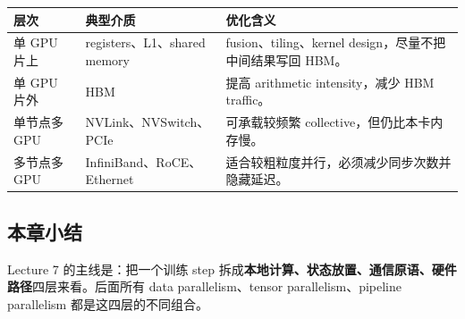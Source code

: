 \begin{center}
\begin{tabular}{L{0.25\textwidth}L{0.3\textwidth}L{0.35\textwidth}}
\toprule
层次 & 典型介质 & 优化含义 \\
\midrule
单 GPU 片上 & registers、L1、shared memory & fusion、tiling、kernel design，尽量不把中间结果写回 HBM。 \\
单 GPU 片外 & HBM & 提高 arithmetic intensity，减少 HBM traffic。 \\
单节点多 GPU & NVLink、NVSwitch、PCIe & 可承载较频繁 collective，但仍比本卡内存慢。 \\
多节点多 GPU & InfiniBand、RoCE、Ethernet & 适合较粗粒度并行，必须减少同步次数并隐藏延迟。 \\
\bottomrule
\end{tabular}
\end{center}

\subsection{本章小结}

Lecture 7 的主线是：把一个训练 step 拆成\textbf{本地计算、状态放置、通信原语、硬件路径}四层来看。后面所有 data parallelism、tensor parallelism、pipeline parallelism 都是这四层的不同组合。

